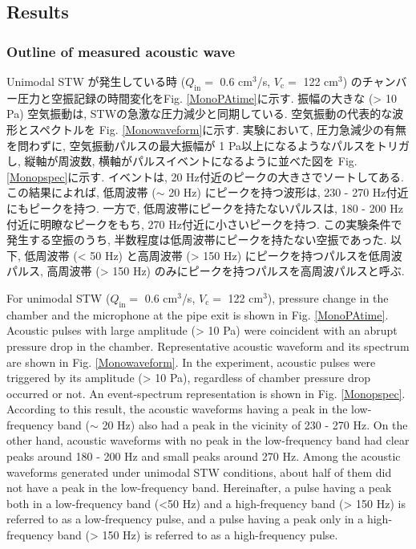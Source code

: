 \documentclass[12pt]{article}
\begin{document}
\clearpage \newpage
\subsection{Results}\label{ACOresult}
\subsubsection{Outline of measured acoustic wave}
Unimodal STW が発生している時 ($Q_\mathrm{in}=$ 0.6 cm$^3$/s, $V_\mathrm{c}=$ 122 cm$^3$) のチャンバー圧力と空振記録の時間変化をFig. \ref{MonoPAtime}に示す. 
振幅の大きな (> 10 Pa) 空気振動は, STWの急激な圧力減少と同期している.
空気振動の代表的な波形とスペクトルを Fig. \ref{Monowaveform}に示す. 
実験において, 圧力急減少の有無を問わずに, 空気振動パルスの最大振幅が 1 Pa以上になるようなパルスをトリガし, 縦軸が周波数, 横軸がパルスイベントになるように並べた図を Fig. \ref{Monopspec}に示す. 
イベントは, 20 Hz付近のピークの大きさでソートしてある. 
この結果によれば, 低周波帯 ($\sim$ 20 Hz) にピークを持つ波形は, 230 - 270 Hz付近にもピークを持つ. 
一方で, 低周波帯にピークを持たないパルスは, 180 - 200 Hz付近に明瞭なピークをもち, 270 Hz付近に小さいピークを持つ. 
この実験条件で発生する空振のうち, 半数程度は低周波帯にピークを持たない空振であった. 
以下, 低周波帯 (< 50 Hz) と高周波帯 (> 150 Hz) にピークを持つパルスを低周波パルス, 高周波帯 (> 150 Hz) のみにピークを持つパルスを高周波パルスと呼ぶ. 

For unimodal STW ($Q_\mathrm{in}=$ 0.6 cm$^3$/s, $V_\mathrm{c}=$ 122 cm$^3$), pressure change in the chamber and the microphone at the pipe exit is shown in Fig. \ref{MonoPAtime}.
Acoustic pulses with large amplitude (> 10 Pa) were coincident with an abrupt pressure drop in the chamber.
Representative acoustic waveform and its spectrum are shown in Fig. \ref{Monowaveform}.
In the experiment, acoustic pulses were triggered by its amplitude (> 10 Pa), regardless of chamber pressure drop occurred or not. 
An event-spectrum representation is shown in Fig. \ref{Monopspec}. 
According to this result, the acoustic waveforms having a peak in the low-frequency band ($\sim$ 20 Hz) also had a peak in the vicinity of 230 - 270 Hz.
On the other hand, acoustic waveforms with no peak in the low-frequency band had clear peaks around 180 - 200 Hz and small peaks around 270 Hz.
Among the acoustic waveforms generated under unimodal STW conditions, about half of them did not have a peak in the low-frequency band.
Hereinafter, a pulse having a peak both in a low-frequency band (<50 Hz) and a high-frequency band (> 150 Hz) is referred to as a low-frequency pulse, and a pulse having a peak only in a high-frequency band (> 150 Hz) is referred to as a high-frequency pulse.
\end{document}

